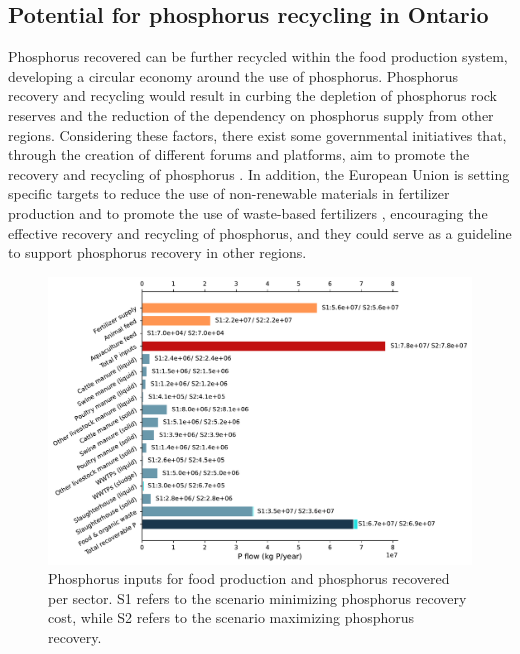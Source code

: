 \documentclass[authoryear]{elsarticle}
\begin{document}
\subsection{Potential for phosphorus recycling in Ontario}
Phosphorus recovered can be further recycled within the food production system, developing a circular economy around the use of phosphorus. Phosphorus recovery and recycling would result in curbing the depletion of phosphorus rock reserves and the reduction of the dependency on phosphorus supply from other regions.
Considering these factors, there exist some governmental initiatives that, through the creation of different forums and platforms, aim to promote the recovery and recycling of phosphorus \citep{NRRPlatform, PFlows_Ontario}. In addition, the European Union is setting specific targets to reduce the use of non-renewable materials in fertilizer production \citep{EurpeanComissionNewFertilizersGoal} and to promote the use of waste-based fertilizers \citep{EurpeanComissionFertilizersRegulation}, encouraging the effective recovery and recycling of phosphorus, and they could serve as a guideline to support phosphorus recovery in other regions. 

\begin{figure}[h]
	\centering
	\includegraphics[width=1\linewidth, trim={0cm 0cm 0cm 0cm},clip]{Figures/PSubstitution.pdf} 
	\caption{Phosphorus inputs for food production and phosphorus recovered per sector. S1 refers to the scenario minimizing phosphorus recovery cost, while S2 refers to the scenario maximizing phosphorus recovery.}
	\label{fig:PSubstitution}
\end{figure}
\end{document}
